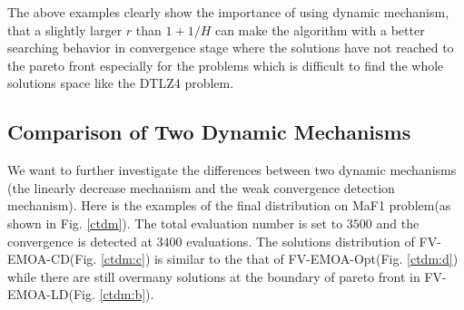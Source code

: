 \documentclass[conference]{IEEEtran}
\begin{document}
The above examples clearly show the importance of using dynamic mechanism, 
that a slightly larger $r$ than $1+1/H$ can make the algorithm with a better searching behavior in 
convergence stage where the solutions have not reached to the pareto front 
especially for the problems which is difficult to find the whole solutions space like the DTLZ4 problem. 

%
\subsection{Comparison of Two Dynamic Mechanisms}
We want to further investigate the differences between two dynamic mechanisms 
(the linearly decrease mechanism and the weak convergence detection mechanism). 
Here is the examples of the final distribution on MaF1 problem(as shown in Fig. \ref{ctdm}).
The total evaluation number is set to $3500$ and the convergence is detected at $3400$ evaluations. 
The solutions distribution of FV-EMOA-CD(Fig. \ref{ctdm:c}) is similar to 
the that of FV-EMOA-Opt(Fig. \ref{ctdm:d})
while there are still overmany solutions at the boundary of pareto front in FV-EMOA-LD(Fig. \ref{ctdm:b}). 
\end{document}
